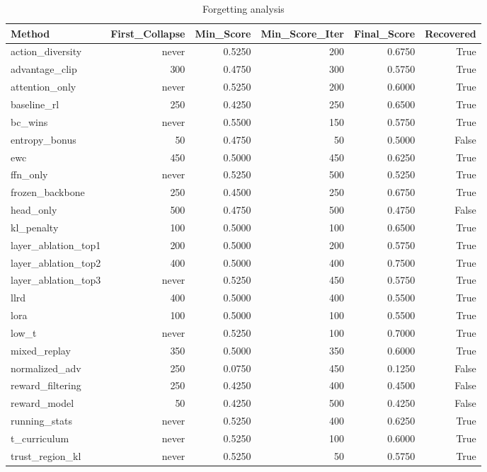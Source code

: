 \begin{table}[htbp]
\centering
\caption{Forgetting analysis}
\label{tab:forgetting}
\begin{tabular}{lrrrrr}
\toprule
\textbf{Method} & \textbf{First\_Collapse} & \textbf{Min\_Score} & \textbf{Min\_Score\_Iter} & \textbf{Final\_Score} & \textbf{Recovered} \\
\midrule
action\_diversity & never & 0.5250 & 200 & 0.6750 & True \\
advantage\_clip & 300 & 0.4750 & 300 & 0.5750 & True \\
attention\_only & never & 0.5250 & 200 & 0.6000 & True \\
baseline\_rl & 250 & 0.4250 & 250 & 0.6500 & True \\
bc\_wins & never & 0.5500 & 150 & 0.5750 & True \\
entropy\_bonus & 50 & 0.4750 & 50 & 0.5000 & False \\
ewc & 450 & 0.5000 & 450 & 0.6250 & True \\
ffn\_only & never & 0.5250 & 500 & 0.5250 & True \\
frozen\_backbone & 250 & 0.4500 & 250 & 0.6750 & True \\
head\_only & 500 & 0.4750 & 500 & 0.4750 & False \\
kl\_penalty & 100 & 0.5000 & 100 & 0.6500 & True \\
layer\_ablation\_top1 & 200 & 0.5000 & 200 & 0.5750 & True \\
layer\_ablation\_top2 & 400 & 0.5000 & 400 & 0.7500 & True \\
layer\_ablation\_top3 & never & 0.5250 & 450 & 0.5750 & True \\
llrd & 400 & 0.5000 & 400 & 0.5500 & True \\
lora & 100 & 0.5000 & 100 & 0.5500 & True \\
low\_t & never & 0.5250 & 100 & 0.7000 & True \\
mixed\_replay & 350 & 0.5000 & 350 & 0.6000 & True \\
normalized\_adv & 250 & 0.0750 & 450 & 0.1250 & False \\
reward\_filtering & 250 & 0.4250 & 400 & 0.4500 & False \\
reward\_model & 50 & 0.4250 & 500 & 0.4250 & False \\
running\_stats & never & 0.5250 & 400 & 0.6250 & True \\
t\_curriculum & never & 0.5250 & 100 & 0.6000 & True \\
trust\_region\_kl & never & 0.5250 & 50 & 0.5750 & True \\
\bottomrule
\end{tabular}
\end{table}